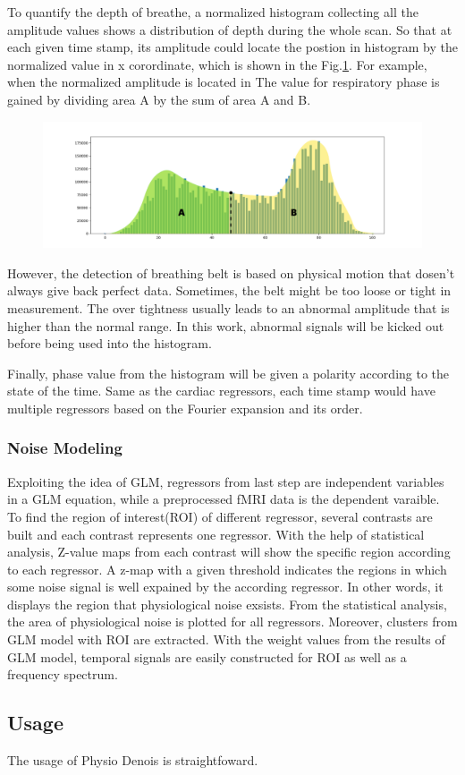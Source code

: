 To quantify the depth of breathe, a normalized histogram collecting all the amplitude values
shows a distribution of depth during the whole scan. 
So that at each given time stamp, its amplitude could locate the postion in histogram by the normalized value in x corordinate,
which is shown in the Fig.\ref{fig:hist}. For example, when the normalized amplitude is located in 
The value for respiratory phase is gained by dividing area A by the sum of area A and B.

\begin{figure}[htp]
    \centering
    \includegraphics[width=\columnwidth]{Figures/histogram.png}
    \caption{}
    \label{fig:hist}
\end{figure}

However, the detection of breathing belt is based on physical motion that dosen't always give back
perfect data. Sometimes, the belt might be too loose or tight in measurement. The over tightness usually leads
to an abnormal amplitude that is higher than the normal range. In this work, abnormal signals will be 
kicked out before being used into the histogram.

Finally, phase value from the histogram will be given a polarity according to the state of the time.
Same as the cardiac regressors, each time stamp would have multiple regressors based 
on the Fourier expansion and its order.


\subsubsection{Noise Modeling}

Exploiting the idea of GLM, regressors from last step are independent variables in a GLM 
equation, while a preprocessed fMRI data is the dependent varaible. 
To find the region of interest(ROI) of different regressor, several contrasts are built and
each contrast represents one regressor. With the help of statistical analysis, 
Z-value maps from each contrast will show the specific region according to each regressor.
A z-map with a given threshold indicates the regions in which 
some noise signal is well expained by the according regressor.
In other words, it displays the region that physiological noise exsists. 
From the statistical analysis, the area of physiological noise is plotted for all regressors.
Moreover, clusters from GLM model with ROI are extracted. With the weight values from the results of GLM model, 
temporal signals are easily constructed for ROI as well as a frequency spectrum.

\subsection{Usage}

The usage of Physio Denois is straightfoward.
